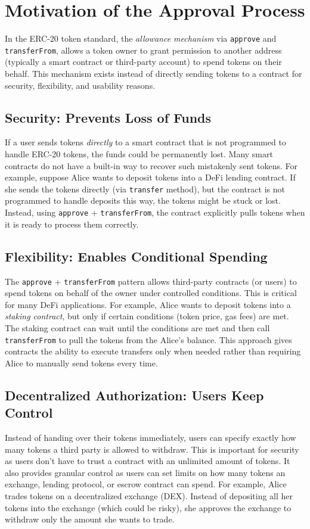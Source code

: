 \section{Motivation of the Approval Process}
In the ERC-20 token standard, the \textsl{allowance mechanism} via \texttt{approve} and \texttt{transferFrom}, allows a token owner to grant permission to another address (typically a smart contract or third-party account) to spend tokens on their behalf. This mechanism exists instead of directly sending tokens to a contract for security, flexibility, and usability reasons.

\subsection{Security: Prevents Loss of Funds}
If a user sends tokens \textsl{directly} to a smart contract that is not programmed to handle ERC-20 tokens, the funds could be permanently lost. Many smart contracts do not have a built-in way to recover such mistakenly sent tokens. For example, suppose Alice wants to deposit tokens into a DeFi lending contract. If she sends the tokens directly (via \texttt{transfer} method), but the contract is not programmed to handle deposits this way, the tokens might be stuck or lost. Instead, using \texttt{approve} + \texttt{transferFrom}, the contract explicitly pulls tokens when it is ready to process them correctly.

\subsection{Flexibility: Enables Conditional Spending}
The \texttt{approve} + \texttt{transferFrom} pattern allows third-party contracts (or users) to spend tokens on behalf of the owner under controlled conditions. This is critical for many DeFi applications. For example, Alice wants to deposit tokens into a \textsl{staking contract}, but only if certain conditions (\eg token price, gas fees) are met. The staking contract can wait until the conditions are met and then call \texttt{transferFrom} to pull the tokens from the Alice’s balance. This approach gives contracts the ability to execute transfers only when needed rather than requiring Alice to manually send tokens every time.

\subsection{Decentralized Authorization: Users Keep Control}
Instead of handing over their tokens immediately, users can specify exactly how many tokens a third party is allowed to withdraw. This is important for security as users don’t have to trust a contract with an unlimited amount of tokens. It also provides granular control as users can set limits on how many tokens an exchange, lending protocol, or escrow contract can spend. For example, Alice trades tokens on a decentralized exchange (DEX). Instead of depositing all her tokens into the exchange (which could be risky), she approves the exchange to withdraw only the amount she wants to trade.

